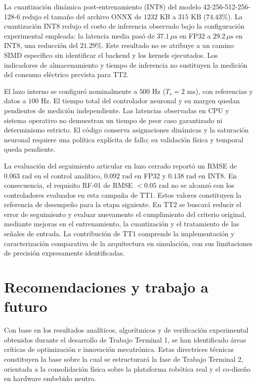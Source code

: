 \documentclass[12pt]{article}
\begin{document}
La cuantización dinámica post-entrenamiento (INT8) del modelo 42-256-512-256-128-6 redujo el tamaño del archivo ONNX de $1232$ KB a $315$ KB ($74.43\%$). La cuantización INT8 redujo el costo de inferencia observado bajo la configuración experimental empleada: la latencia media pasó de $37.1\,\mu\text{s}$ en FP32 a $29.2\,\mu\text{s}$ en INT8, una reducción del $21.29\%$. Este resultado no se atribuye a un camino SIMD específico sin identificar el backend y los kernels ejecutados. Los indicadores de almacenamiento y tiempo de inferencia no sustituyen la medición del consumo eléctrico prevista para TT2.

El lazo interno se configuró nominalmente a $500$ Hz ($T_s=2$ ms), con referencias y datos a $100$ Hz. El tiempo total del controlador neuronal y su margen quedan pendientes de medición independiente. Las latencias observadas en CPU y sistema operativo no demuestran un tiempo de peor caso garantizado ni determinismo estricto. El código conserva asignaciones dinámicas y la saturación neuronal requiere una política explícita de fallo; su validación física y temporal queda pendiente.

La evaluación del seguimiento articular en lazo cerrado reportó un RMSE de $0.063\text{ rad}$ en el control analítico, $0.092\text{ rad}$ en FP32 y $0.138\text{ rad}$ en INT8. En consecuencia, el requisito RF-01 de RMSE $<0.05\text{ rad}$ no se alcanzó con los controladores evaluados en esta campaña de TT1. Estos valores constituyen la referencia de desempeño para la etapa siguiente. En TT2 se buscará reducir el error de seguimiento y evaluar nuevamente el cumplimiento del criterio original, mediante mejoras en el entrenamiento, la cuantización y el tratamiento de las señales de entrada. La contribución de TT1 comprende la implementación y caracterización comparativa de la arquitectura en simulación, con sus limitaciones de precisión expresamente identificadas.


\section*{Recomendaciones y trabajo a futuro}

Con base en los resultados analíticos, algorítmicos y de verificación experimental obtenidos durante el desarrollo de Trabajo Terminal 1, se han identificado áreas críticas de optimización e innovación mecatrónica. Estas directrices técnicas constituyen la base sobre la cual se estructurará la fase de Trabajo Terminal 2, orientada a la consolidación física sobre la plataforma robótica real y el co-diseño en hardware embebido neutro.
\end{document}
